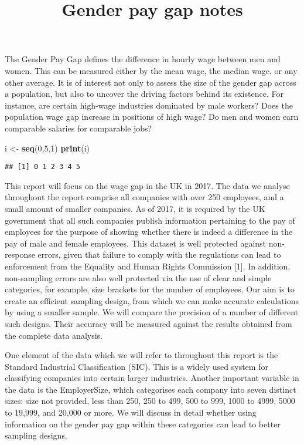 \documentclass[]{article}
\title{Gender pay gap notes}
\author{}
\date{}
\newenvironment{Shaded}{\begin{snugshade}}{\end{snugshade}}
\newcommand{\KeywordTok}[1]{\textcolor[rgb]{0.13,0.29,0.53}{\textbf{#1}}}
\newcommand{\DecValTok}[1]{\textcolor[rgb]{0.00,0.00,0.81}{#1}}
\newcommand{\StringTok}[1]{\textcolor[rgb]{0.31,0.60,0.02}{#1}}
\newcommand{\NormalTok}[1]{#1}
\begin{document}
\maketitle

The Gender Pay Gap defines the difference in hourly wage between men and
women. This can be measured either by the mean wage, the median wage, or
any other average. It is of interest not only to assess the size of the
gender gap across a population, but also to uncover the driving factors
behind its existence. For instance, are certain high-wage industries
dominated by male workers? Does the population wage gap increase in
positions of high wage? Do men and women earn comparable salaries for
comparable jobs?

\begin{Shaded}
\begin{Highlighting}[]
\NormalTok{i <-}\StringTok{ }\KeywordTok{seq}\NormalTok{(}\DecValTok{0}\NormalTok{,}\DecValTok{5}\NormalTok{,}\DecValTok{1}\NormalTok{)}
\KeywordTok{print}\NormalTok{(i)}
\end{Highlighting}
\end{Shaded}

\begin{verbatim}
## [1] 0 1 2 3 4 5
\end{verbatim}

This report will focus on the wage gap in the UK in 2017. The data we
analyse throughout the report comprise all companies with over 250
employees, and a small amount of smaller companies. As of 2017, it is
required by the UK government that all such companies publish
information pertaining to the pay of employees for the purpose of
showing whether there is indeed a difference in the pay of male and
female employees. This dataset is well protected against non-response
errors, given that failure to comply with the regulations can lead to
enforcement from the Equality and Human Rights Commission {[}1{]}. In
addition, non-sampling errors are also well protected via the use of
clear and simple categories, for example, size brackets for the number
of employees. Our aim is to create an efficient sampling design, from
which we can make accurate calculations by using a smaller sample. We
will compare the precision of a number of different such designs. Their
accuracy will be measured against the results obtained from the complete
data analysis.

One element of the data which we will refer to throughout this report is
the Standard Industrial Classification (SIC). This is a widely used
system for classifying companies into certain larger industries. Another
important variable in the data is the EmployerSize, which categorises
each company into seven distinct sizes: size not provided, less than
250, 250 to 499, 500 to 999, 1000 to 4999, 5000 to 19,999, and 20,000 or
more. We will discuss in detail whether using information on the gender
pay gap within these categories can lead to better sampling designs.
\end{document}
